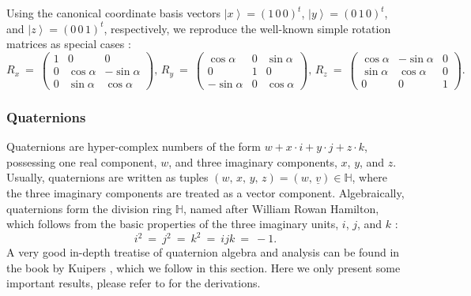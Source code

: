Using the canonical coordinate basis vectors $\left| x \right> = \left( 1\,0\,0 \right)^t$, $\left| y \right> = \left( 0\,1\,0 \right)^t$,
and $\left| z \right> = \left( 0\,0\,1 \right)^t$, respectively, we reproduce the well-known simple rotation matrices as 
special cases \cite[p. 238]{Bronstein2008}:
\begin{equation}
	R_x \ =\ 
		\left( \begin{array}{ccc} 
			1 &            0 &            0  \\
			0 &  \cos \alpha & -\sin \alpha  \\
			0 & \sin \alpha  &  \cos \alpha
		\end{array} \right),\,
	R_y \ =\ 
		\left( \begin{array}{ccc} 
			  \cos \alpha &         0 &  \sin \alpha \\
			           0  &         1 &            0 \\
			-\sin \alpha  &         0 &  \cos \alpha
		\end{array} \right),\,
	R_z \ =\ 
		\left( \begin{array}{ccc} 
			 \cos \alpha & -\sin \alpha &             0  \\
			\sin \alpha  &  \cos \alpha &             0  \\
			           0 &            0 &             1
		\end{array} \right).
\end{equation}


\subsubsection{Quaternions}
Quaternions are hyper-complex numbers of the form $w + x \cdot i + y \cdot j + z \cdot k$, possessing one real 
component, $w$, and three imaginary components, $x$, $y$, and $z$. 
Usually, quaternions are written as tuples $\left( w,\,x,\,y,\,z \right) = \left( w,\,\underline{v} \right) \in \mathbb{H}$,
where the three imaginary components are treated as a vector component.
Algebraically, quaternions form the division ring $\mathbb{H}$, named after William Rowan Hamilton, which follows from the 
basic properties of the three imaginary units, $i$, $j$, and $k$ \cite[p. 103]{Kuipers2002}:
\begin{equation}
	i^2 \ =\ j^2 \ =\ k^2 \ =\ ijk \ =\ -1.
	\label{eq:quat_basic}
\end{equation}
A very good in-depth treatise of quaternion algebra and analysis can be found in the book by Kuipers \cite{Kuipers2002},
which we follow in this section.
Here we only present some important results, please refer to \cite{Kuipers2002} for the derivations.

